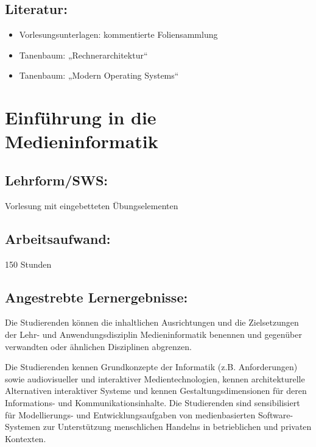 \section*{Literatur:}\label{literatur-6}

\begin{itemize}
\item
  Vorlesungsunterlagen: kommentierte Foliensammlung
\item
  Tanenbaum: „Rechnerarchitektur``
\item
  Tanenbaum: „Modern Operating Systems``
\end{itemize}

\chapter{Einführung in die
Medieninformatik}\label{einfuxfchrung-in-die-medieninformatik}

\section*{Lehrform/SWS:}\label{lehrformsws-5}

Vorlesung mit eingebetteten Übungselementen

\section*{Arbeitsaufwand:}\label{arbeitsaufwand-5}

150 Stunden

\section*{Angestrebte
Lernergebnisse:}\label{angestrebte-lernergebnisse-9}

Die Studierenden können die inhaltlichen Ausrichtungen und die
Zielsetzungen der Lehr- und Anwendungsdisziplin Medieninformatik
benennen und gegenüber verwandten oder ähnlichen Disziplinen abgrenzen.

Die Studierenden kennen Grundkonzepte der Informatik (z.B.
Anforderungen) sowie audiovisueller und interaktiver Medientechnologien,
kennen architekturelle Alternativen interaktiver Systeme und kennen
Gestaltungsdimensionen für deren Informations- und
Kommunikationsinhalte. Die Studierenden sind sensibilisiert für
Modellierungs- und Entwicklungsaufgaben von medienbasierten
Software-Systemen zur Unterstützung menschlichen Handelns in
betrieblichen und privaten Kontexten.


